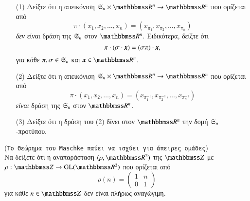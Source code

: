 \documentclass[12pt,a4paper,reqno]{amsart}
\begin{document}
\begin{exercise}
    \leavevmode
    \begin{itemize}
        \item[(1)] Δείξτε ότι η απεικόνιση $\fS_n\times\RR^n \to \RR^n$ που ορίζεται από 
        \[
        \pi\cdot(x_1, x_2, \dots, x_n) = (x_{\pi_1},x_{\pi_2}, \dots, x_{\pi_n})
        \]
        \emph{δεν} είναι δράση της $\mathfrak{S}_n$ στον $\RR^n$. Ειδικότερα, δείξτε ότι 
        \[
        \pi\cdot(\sigma\cdot \pmb{x}) = (\sigma\pi)\cdot\pmb{x},
        \]
        για κάθε $\pi, \sigma \in \mathfrak{S}_n$ και $\bfx \in \RR^n$.
        \item[(2)] Δείξτε ότι η απεικόνιση $\fS_n\times\RR^n \to \RR^n$ που ορίζεται από 
        \[
        \pi\cdot(x_1, x_2, \dots, x_n) = (x_{\pi_1^{-1}},x_{\pi_2^{-1}}, \dots, x_{\pi_n^{-1}})
        \]
        \emph{είναι} δράση της $\mathfrak{S}_n$ στον $\RR^n$.
        \item[(3)] Δείξτε ότι η δράση του (2) δίνει στον $\RR^n$ την δομή $\mathfrak{S}_n$-προτύπου.
    \end{itemize}
\end{exercise}

\begin{exercise}{(\texttt{Το Θεώρημα του \textlatin{Maschke} παύει να ισχύει για άπειρες ομάδες})}
    \\
    Να δείξετε ότι η αναπαράσταση $(\rho, \RR^2)$ της $\ZZ$ με $\rho : \ZZ \to \GL(\RR^2)$ που ορίζεται από 
    \[
    \rho(n) = 
        \begin{pmatrix}
            1 & n \\
            0 & 1
        \end{pmatrix}
    \]
    για κάθε $n \in \ZZ$ δεν είναι πλήρως αναγώγιμη.
\end{exercise}
\end{document}
